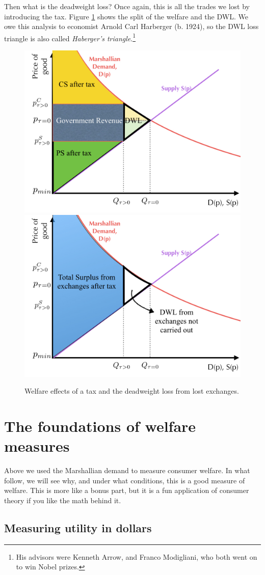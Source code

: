 \documentclass[11pt,english]{article}
\begin{document}
Then what is the deadweight loss? Once again, this is all the trades we lost by introducing the tax. Figure \ref{fig:wrapup} shows the split of the welfare and the DWL. We owe this analysis to economist Arnold Carl Harberger (b. 1924), so the DWL loss triangle is also called \emph{Haberger's triangle}.\footnote{His advisors were Kenneth Arrow, and Franco Modigliani, who both went on to win Nobel prizes.} 

\begin{figure}
	\centering
	\includegraphics[width=0.5\linewidth]{Figures/Tax3}\includegraphics[width=0.5\linewidth]{Figures/Tax4}
	\caption{Welfare effects of a tax and the deadweight loss from lost exchanges.}
	\label{fig:wrapup}
\end{figure}


\section{The foundations of welfare measures}

Above we used the Marshallian demand to measure consumer welfare. In what follow, we will see why, and under what conditions, this is a good measure of welfare. This is more like a bonus part, but it is a fun application of consumer theory if you like the math behind it.

\subsection{Measuring utility in dollars}
\end{document}
